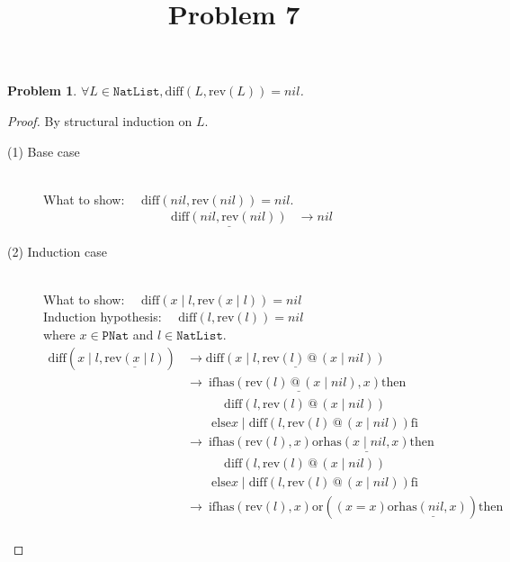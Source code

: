 \documentclass[12pt, a4paper]{article}
\title{Problem 7}
\date{\vspace{-5ex}}
\newtheorem{problem}{Problem}
\newcommand{\rel}[1]{\mathrel{#1}}
\newcommand{\rmx}[1]{\mathrm{#1}}
\newcommand{\larrow}{\longrightarrow}
\newcommand{\under}{\underline}
\begin{document}
\maketitle

\begin{problem}
$\forall L \in \mathtt{NatList}, \rmx{diff}(L, \rmx{rev}(L)) = nil$.
\end{problem}
\begin{proof}
By structural induction on $L$.

\begin{description}
\item[(1) Base case]~\\
\noindent
What to show: $\quad \rmx{diff}(nil, \rmx{rev}(nil)) = nil$.
\begin{align*}
\under{\rmx{diff}(nil, \rmx{rev}(nil))}
	&\larrow nil \tag{by diff1}
\end{align*}
\item[(2) Induction case]~\\
What to show: $\quad \rmx{diff}(x \rel{|} l, \rmx{rev}(x \rel{|} l)) = nil$ \\
Induction hypothesis: $\quad \rmx{diff}(l, \rmx{rev}(l)) = nil$  \\
where $x \in \mathtt{PNat}$ and $l \in \mathtt{NatList}$.
\begin{align*}
\rmx{diff}(x \rel{|} l, \under{\rmx{rev}(x \rel{|} l)})
	&\larrow \under{\rmx{diff}(x \rel{|} l, \rmx{rev}(l) \rel{@} (x \rel{|} nil))} \tag{by rev2} \\
	&\larrow\ \rel{\rmx{if}} \under{\rmx{has}(\rmx{rev}(l) \rel{@} (x \rel{|} nil), x)} \rel{\rmx{then}} \\
	&\quad \quad \quad \rmx{diff}(l, \rmx{rev}(l) \rel{@} (x \rel{|} nil)) \\
	&\quad \quad \rel{\rmx{else}} x \rel{|} \rmx{diff}(l, \rmx{rev}(l) \rel{@}(x \rel{|} nil)) \rel{\rmx{fi}} \tag{by diff2} \\
	&\larrow\ \rel{\rmx{if}} \rmx{has}(\rmx{rev}(l), x) \rel{\rmx{or}} \under{\rmx{has}(x \rel{|} nil, x)} \rel{\rmx{then}} \\
	&\quad \quad \quad \rmx{diff}(l, \rmx{rev}(l) \rel{@} (x \rel{|} nil)) \\
	&\quad \quad \rel{\rmx{else}} x \rel{|} \rmx{diff}(l, \rmx{rev}(l) \rel{@}(x \rel{|} nil)) \rel{\rmx{fi}} \tag{by Lemma 1 from Problem 6} \\	
	&\larrow\ \rel{\rmx{if}} \rmx{has}(\rmx{rev}(l), x) \rel{\rmx{or}} ((x = x) \rel{\rmx{or}} \under{\rmx{has}(nil, x)}) \rel{\rmx{then}} \\

\end{align*}
\end{description}
\end{proof}
\end{document}
